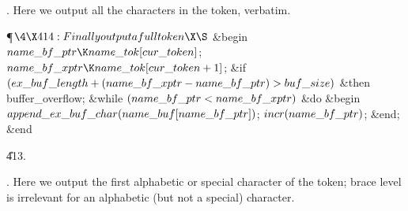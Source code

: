 .
Here we output all the characters in the token, verbatim.

\Y\P$\4\X414:Finally output a full token\X\S$\6
\&{begin} $\\{name\_bf\_ptr}\K\\{name\_tok}[\\{cur\_token}]$;\5
$\\{name\_bf\_xptr}\K\\{name\_tok}[\\{cur\_token}+1]$;\6
\&{if} $(\\{ex\_buf\_length}+(\\{name\_bf\_xptr}-\\{name\_bf\_ptr})>\\{buf%
\_size})$ \1\&{then}\5
\\{buffer\_overflow};\2\6
\&{while} $(\\{name\_bf\_ptr}<\\{name\_bf\_xptr})$ \1\&{do}\6
\&{begin} $\\{append\_ex\_buf\_char}(\\{name\_buf}[\\{name\_bf\_ptr}])$;\5
$\\{incr}(\\{name\_bf\_ptr})$;\6
\&{end};\2\6
\&{end}\par
\U413.\fi

.
Here we output the first alphabetic or special character of the token;
brace level is irrelevant for an alphabetic (but not a special)
character.

